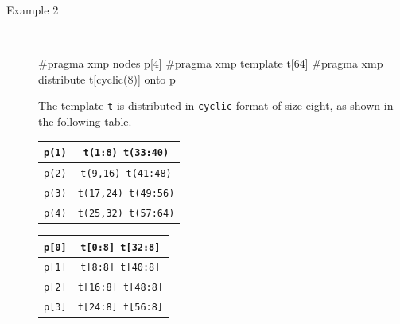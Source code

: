 \begin{description}
\item[Example 2]~\\[0.5cm]
\begin{minipage}{0.43\hsize}
\begin{center}
{\small
{}
}
\end{center}
\end{minipage}
%
\begin{minipage}{0.5\hsize}
\begin{center}
{\small
\begin{XCexampleR}
#pragma xmp nodes p[4]
#pragma xmp template t[64]
#pragma xmp distribute t[cyclic(8)] onto p
\end{XCexampleR}
}
\end{center}
\end{minipage}

The template {\tt t} is distributed in {\tt cyclic} format of size
eight, as shown in the following table.

\begin{minipage}{0.43\hsize}
\begin{center}
\begin{tabular}{|c|c|} \hline
{\tt p(1)} & {\tt t(1:8) t(33:40)}   \\ \hline
{\tt p(2)} & {\tt t(9,16) t(41:48)}  \\ \hline
{\tt p(3)} & {\tt t(17,24) t(49:56)} \\ \hline
{\tt p(4)} & {\tt t(25,32) t(57:64)} \\ \hline
\end{tabular}
\end{center}
\end{minipage}
%
\begin{minipage}{0.5\hsize}
\begin{center}
\begin{tabular}{|c|c|} \hline
{\tt p[0]} & {\tt t[0:8] t[32:8]}  \\ \hline
{\tt p[1]} & {\tt t[8:8] t[40:8]} \\ \hline
{\tt p[2]} & {\tt t[16:8] t[48:8]} \\ \hline
{\tt p[3]} & {\tt t[24:8] t[56:8]} \\ \hline
\end{tabular}
\end{center}
\end{minipage}


\end{description}
